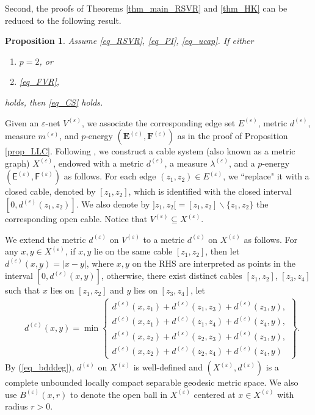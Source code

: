 \documentclass[11pt,a4paper]{article}
\numberwithin{equation}{section}
\theoremstyle{plain}
\newtheorem{proposition}[theorem]{Proposition}
\theoremstyle{definition}
\begin{document}
Second, the proofs of Theorems \ref{thm_main_RSVR} and \ref{thm_HK} can be reduced to the following result.

\begin{proposition}\label{prop_CS_X}
Assume \ref{eq_RSVR}, \ref{eq_PI}, \ref{eq_ucap}. If either
\begin{enumerate}[label=(\arabic*)]
\item $p=2$, or 
\item \ref{eq_FVR},
\end{enumerate}
holds, then \ref{eq_CS} holds.
\end{proposition}

Given an $\varepsilon$-net $V^{(\varepsilon)}$, we associate the corresponding edge set $E^{(\varepsilon)}$, metric $d^{(\varepsilon)}$, measure $m^{(\varepsilon)}$, and $p$-energy $(\mathbf{E}^{(\varepsilon)},\mathbf{F}^{(\varepsilon)})$ as in the proof of Proposition \ref{prop_LLC}. Following \cite[Section 3]{DRY23}, we construct a cable system (also known as a metric graph) $X^{(\varepsilon)}$, endowed with a metric $d^{(\varepsilon)}$, a measure $\lambda^{(\varepsilon)}$, and a $p$-energy $(\mathsf{E}^{(\varepsilon)},\mathsf{F}^{(\varepsilon)})$ as follows. For each edge $(z_1,z_2)\in E^{(\varepsilon)}$, we ``replace" it with a closed cable, denoted by $[z_1,z_2]$, which is identified with the closed interval $[0,d^{(\varepsilon)}(z_1,z_2)]$. We also denote by $]z_1,z_2[=[z_1,z_2]\backslash\{z_1,z_2\}$ the corresponding open cable. Notice that $V^{(\varepsilon)}\subseteq X^{(\varepsilon)}$.

We extend the metric $d^{(\varepsilon)}$ on $V^{(\varepsilon)}$ to a metric $d^{(\varepsilon)}$ on $X^{(\varepsilon)}$ as follows. For any $x,y\in X^{(\varepsilon)}$, if $x, y$ lie on the same cable $[z_1,z_2]$, then let $d^{(\varepsilon)}(x,y)=|x-y|$, where $x,y$ on the RHS are interpreted as points in the interval $[0,d^{(\varepsilon)}(x,y)]$, otherwise, there exist distinct cables $[z_1,z_2]$, $[z_3,z_4]$ such that $x$ lies on $[z_1,z_2]$ and $y$ lies on $[z_3,z_4]$, let
\begin{align*}
&d^{(\varepsilon)}(x,y)=\min \left\{
\begin{array}{l}
d^{(\varepsilon)}(x,z_1)+d^{(\varepsilon)}(z_1,z_3)+d^{(\varepsilon)}(z_3,y),\\
d^{(\varepsilon)}(x,z_1)+d^{(\varepsilon)}(z_1,z_4)+d^{(\varepsilon)}(z_4,y),\\
d^{(\varepsilon)}(x,z_2)+d^{(\varepsilon)}(z_2,z_3)+d^{(\varepsilon)}(z_3,y),\\
d^{(\varepsilon)}(x,z_2)+d^{(\varepsilon)}(z_2,z_4)+d^{(\varepsilon)}(z_4,y)
\end{array}
\right\}.
\end{align*}
By (\ref{eq_bdddeg}), $d^{(\varepsilon)}$ on $X^{(\varepsilon)}$ is well-defined and $(X^{(\varepsilon)},d^{(\varepsilon)})$ is a complete unbounded locally compact separable geodesic metric space. We also use $B^{(\varepsilon)}(x,r)$ to denote the open ball in $X^{(\varepsilon)}$ centered at $x\in X^{(\varepsilon)}$ with radius $r>0$.
\end{document}
